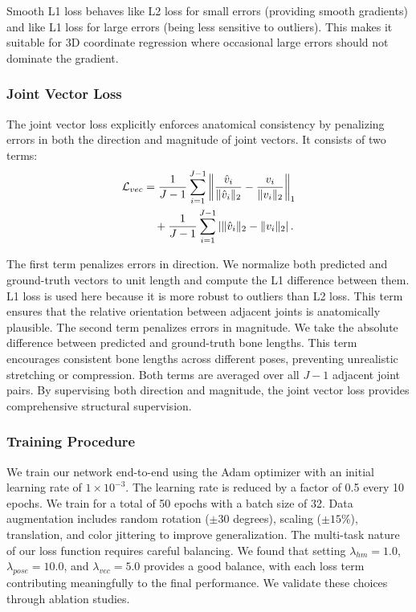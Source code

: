 Smooth L1 loss behaves like L2 loss for small errors (providing smooth gradients) and like L1 loss for large errors (being less sensitive to outliers). This makes it suitable for 3D coordinate regression where occasional large errors should not dominate the gradient.

\subsubsection{Joint Vector Loss}
The joint vector loss explicitly enforces anatomical consistency by penalizing errors in both the direction and magnitude of joint vectors. It consists of two terms:
\begin{align}
\small
\mathcal{L}_{vec} &= \frac{1}{J-1}\sum_{i=1}^{J-1}
\left\|
\frac{\hat{v}_i}{\|\hat{v}_i\|_2} -
\frac{v_i}{\|v_i\|_2}
\right\|_1 \\
&\quad + \frac{1}{J-1}\sum_{i=1}^{J-1}
\left| \|\hat{v}_i\|_2 - \|v_i\|_2 \right|.
\end{align}

The first term penalizes errors in direction. We normalize both predicted and ground-truth vectors to unit length and compute the L1 difference between them. L1 loss is used here because it is more robust to outliers than L2 loss. This term ensures that the relative orientation between adjacent joints is anatomically plausible.
The second term penalizes errors in magnitude. We take the absolute difference between predicted and ground-truth bone lengths. This term encourages consistent bone lengths across different poses, preventing unrealistic stretching or compression.
Both terms are averaged over all \(J-1\) adjacent joint pairs. By supervising both direction and magnitude, the joint vector loss provides comprehensive structural supervision.

\subsubsection{Training Procedure}
We train our network end-to-end using the Adam optimizer with an initial learning rate of \(1 \times 10^{-3}\). The learning rate is reduced by a factor of 0.5 every 10 epochs. We train for a total of 50 epochs with a batch size of 32. Data augmentation includes random rotation (\(\pm 30\) degrees), scaling (\(\pm 15\%\)), translation, and color jittering to improve generalization.
The multi-task nature of our loss function requires careful balancing. We found that setting \(\lambda_{hm}=1.0\), \(\lambda_{pose}=10.0\), and \(\lambda_{vec}=5.0\) provides a good balance, with each loss term contributing meaningfully to the final performance. We validate these choices through ablation studies.

